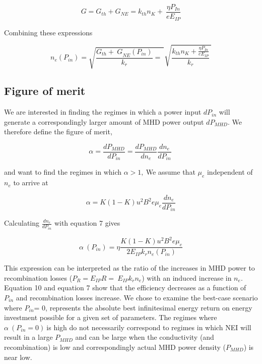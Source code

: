 \begin{equation}
G = G_{th} + G_{NE} = k_{th}n_{K} + \ \frac{\eta P_{In}}{eE_{IP}}
\end{equation}

Combining these expressions

\begin{equation}
n_{e}(P_{in}) = \sqrt{\frac{{G_{th} + \ G}_{NE}(P_{in})}{k_{r}} = \ }\sqrt{\frac{k_{th}n_{K} + \frac{\eta P_{In}}{eE_{IP}}}{k_{r}}\ }
\end{equation}

\hypertarget{figure-of-merit}{%
\subsection{Figure of merit}\label{figure-of-merit}}

We are interested in finding the regimes in which a power input \(dP_{in}\) will generate a correspondingly larger amount of MHD power output \(dP_{MHD}\). We therefore define the figure of merit,

\begin{equation}
\alpha = \frac{{dP}_{MHD}}{dP_{in}} = \frac{{dP}_{MHD}}{dn_{e}}\frac{dn_{e}}{dP_{in}}\ 
\end{equation}


and want to find the regimes in which \(\alpha > 1,\ \)We assume that \(\mu_{e}\) independent of \(n_{e}\) to arrive at

\begin{equation}
\alpha = K(1 - K)u^{2}B^{2}e\mu_{e}\frac{dn_{e}}{dP_{in}}
\end{equation}


Calculating \(\frac{dn_{e}}{dP_{in}}\) with equation 7 gives

\begin{equation}
\alpha\ (P_{in}) = \eta\frac{K(1 - K)u^{2}B^{2}e\mu_{e}}{2E_{IP}k_{r}n_{e}(P_{in})}
\end{equation}


This expression can be interpreted as the ratio of the increases in MHD power to recombination losses (\(P_{R} = E_{IP}R = \ E_{IP}k_{r}n_{e}\)) with an induced increase in \(n_{e}\). Equation 10 and equation 7 show that the efficiency decreases as a function of \(P_{in}\) and recombination losses increase. We chose to examine the best-case scenario where \(P_{in}\)= 0, represents the absolute best infinitesimal energy return on energy investment possible for a given set of parameters. The regimes where \(\alpha\ \left( P_{in} = 0 \right)\ \)is high do not necessarily correspond to regimes in which NEI will result in a large \(P_{MHD}\) and can be large when the conductivity (and recombination) is low and correspondingly actual MHD power density (\(P_{MHD}\)) is near low.



